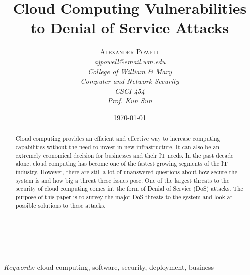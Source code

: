 \documentclass[a4paper, 8pt]{article} %
\title{\textbf{Cloud Computing Vulnerabilities to Denial of Service Attacks}} %
\author{\textsc{Alexander Powell} %
\\{\textit{ajpowell@email.wm.edu}} %
\\{\textit{College of William \& Mary}} %
\\{\textit{Computer and Network Security}} %
\\{\textit{CSCI 454}} %
\\{\textit{Prof. Kun Sun}}} %
\date{\today} %
\makeatletter
\renewcommand{\maketitle}{ %
\begin{flushright} %
{\LARGE\@title} %

\vspace{50pt} %

{\large\@author} %
\\\@date %

\vspace{40pt} %
\end{flushright}
}
\makeatother
\begin{document}
\maketitle %


\begin{doublespacing}
\begin{abstract}
Cloud computing provides an efficient and effective way to increase computing capabilities without the need to invest in new infrastructure.  It can also be an extremely economical decision for businesses and their IT needs.  In the past decade alone, cloud computing has become one of the fastest growing segments of the IT industry.  However, there are still a lot of unanswered questions about how secure the system is and how big a threat these issues pose.  One of the largest threats to the security of cloud computing comes int the form of Denial of Service (DoS) attacks.  The purpose of this paper is to survey the major DoS threats to the system and look at possible solutions to these attacks.  \\ \\
\end{abstract}
\end{doublespacing}

\hspace*{3,6mm}\textit{Keywords:} cloud-computing, software, security, deployment, business %

\vspace{30pt} %

\newpage
\end{document}
